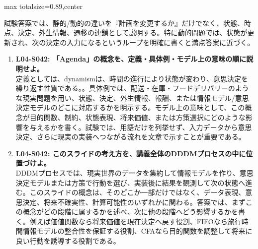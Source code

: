 \begin{minipage}[t]{0.58\textwidth}
\begin{adjustbox}{max totalsize={\textwidth}{0.89\textheight},center}
\begin{minipage}{\textwidth}
試験答案では、静的/動的の違いを『計画を変更するか』だけでなく、状態、時点、決定、外生情報、遷移の連鎖として説明する。特に動的問題では、状態が更新され、次の決定の入力になるというループを明確に書くと満点答案に近づく。\par{}\begin{enumerate}\item \textbf{L04-S042: 「Agenda」の概念を、定義・具体例・モデル上の意味の順に説明せよ。}\\定義としては、dynamismは、時間の進行により状態が変わり、意思決定を繰り返す性質である。。具体例では、配送・在庫・フードデリバリーのような現実問題を用い、状態、決定、外生情報、報酬、または情報モデル/意思決定モデルのどこに対応するかを明示する。モデル上の意味として、この概念が目的関数、制約、状態表現、将来価値、または方策選択にどのような影響を与えるかを書く。試験では、用語だけを列挙せず、入力データから意思決定、さらに現実の実装へつながる流れを文章で示すことが重要である。\item \textbf{L04-S042: このスライドの考え方を、講義全体のDDDMプロセスの中に位置づけよ。}\\DDDMプロセスでは、現実世界のデータを集約して情報モデルを作り、意思決定モデルまたは方策で行動を選び、実装後に結果を観測して次の状態へ進む。このスライドの概念は、そのどこか一部だけではなく、データ表現、意思決定、将来不確実性、計算可能性のいずれかに関わる。答案では、まずこの概念がどの段階に属するかを述べ、次に他の段階へどう影響するかを書く。例えば価値関数なら将来価値を現在決定へ戻す役割、FIFOなら旅行時間情報モデルの整合性を保証する役割、CFAなら目的関数を調整して将来に良い行動を誘導する役割である。\end{enumerate}
\end{minipage}
\end{adjustbox}
\end{minipage}


